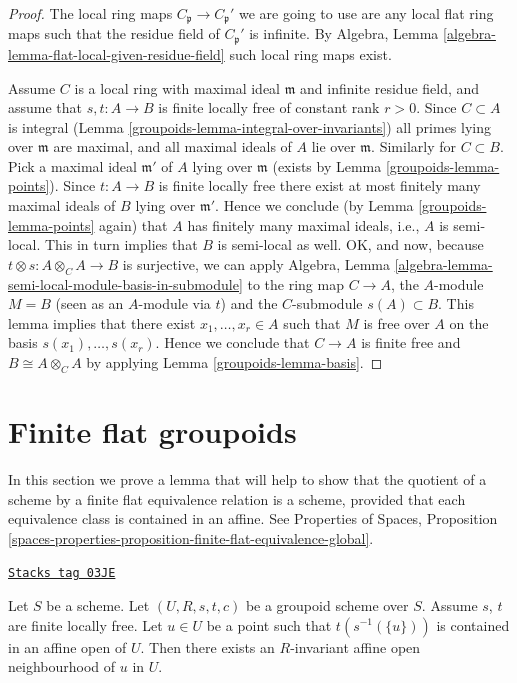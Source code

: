 \begin{proof}
\medskip\noindent
The local ring maps $C_{\mathfrak p} \to C_{\mathfrak p}'$ we are going
to use are any local flat ring maps such that the residue field of
$C_{\mathfrak p}'$ is infinite.
By Algebra, Lemma \ref{algebra-lemma-flat-local-given-residue-field}
such local ring maps exist.

\medskip\noindent
Assume $C$ is a local ring with maximal ideal $\mathfrak m$ and
infinite residue field, and assume that $s, t : A \to B$ is
finite locally free of constant rank $r > 0$.
Since $C \subset A$ is integral (Lemma \ref{groupoids-lemma-integral-over-invariants})
all primes lying over $\mathfrak m$ are maximal, and all maximal
ideals of $A$ lie over $\mathfrak m$. Similarly for $C \subset B$.
Pick a maximal ideal $\mathfrak m'$
of $A$ lying over $\mathfrak m$ (exists by Lemma \ref{groupoids-lemma-points}).
Since $t : A \to B$ is finite locally free there exist at most finitely
many maximal ideals of $B$ lying over $\mathfrak m'$. Hence we conclude
(by Lemma \ref{groupoids-lemma-points} again)
that $A$ has finitely many maximal ideals, i.e.,
$A$ is semi-local. This in turn implies that $B$ is semi-local as
well. OK, and now, because $t \otimes s : A \otimes_C A \to B$ is surjective,
we can apply
Algebra, Lemma \ref{algebra-lemma-semi-local-module-basis-in-submodule}
to the ring map $C \to A$, the $A$-module $M = B$ (seen as an $A$-module
via $t$) and the $C$-submodule $s(A) \subset B$. This lemma implies that there
exist $x_1, \ldots, x_r \in A$ such that $M$ is free over $A$
on the basis $s(x_1), \ldots, s(x_r)$. Hence we conclude that $C \to A$
is finite free and $B \cong A \otimes_C A$ by applying
Lemma \ref{groupoids-lemma-basis}.
\end{proof}

\section{Finite flat groupoids}
\label{groupoids-section-finite-flat-general}
In this section we prove a lemma that will help to show that the quotient
of a scheme by a finite flat equivalence relation is a scheme, provided that
each equivalence class is contained in an affine. See
Properties of Spaces,
Proposition \ref{spaces-properties-proposition-finite-flat-equivalence-global}.

\begin{lemma}
\label{groupoids-lemma-find-invariant-affine}
\href{https://stacks.math.columbia.edu/tag/03JE}{\texttt{Stacks tag 03JE}}

Let $S$ be a scheme.
Let $(U, R, s, t, c)$ be a groupoid scheme over $S$.
Assume $s$, $t$ are finite locally free.
Let $u \in U$ be a point such that $t(s^{-1}(\{u\}))$
is contained in an affine open of $U$.
Then there exists an $R$-invariant affine open neighbourhood
of $u$ in $U$.
\end{lemma}


